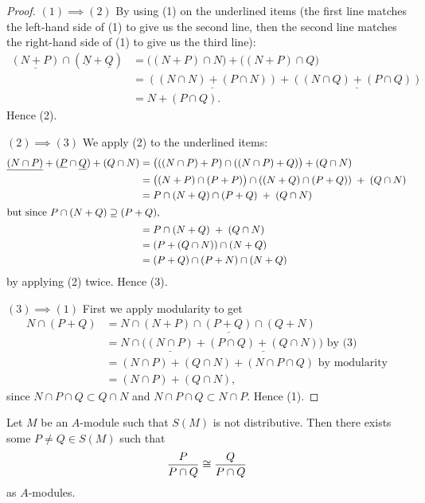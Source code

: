 \begin{proof}
$(1)\implies(2)$ By using (1) on the underlined items (the first line
  matches the left-hand side of (1) to give us the second line, then the second line matches the
  right-hand side of (1) to give us the third line):
\begin{subequations}
  \begin{align}
\underline{(N+P)}\cap(\underline{N}+\underline{Q}) &= \bigl((N+P)\cap N\bigr)+\bigl((N+P)\cap Q\bigr)\\
&=\underline{((N\cap N)+(P\cap N))}+\underline{((N\cap Q)+(P\cap Q))}\\
&=N+(P\cap Q).
  \end{align}
\end{subequations}
Hence (2).

$(2)\implies(3)$ We apply (2) to the underlined items:
\begin{subequations}
  \begin{align}
\underline{(N\cap P)}+(\underline{P}\cap\underline{Q})+(Q\cap N)
&=\bigl(((N\cap P)+P)\cap((N\cap P)+Q)\bigr)+(Q\cap N)\\
&=\bigl((N+P)\cap(P+P)\bigr)\cap((N+Q)\cap(P+Q))\;+\;(Q\cap N)\\
&=P\cap(N+Q)\cap(P+Q)\;+\;(Q\cap N)\\\intertext{but since $P\cap(N+Q)\supset(P+Q)$,}
&=P\cap(N+Q)\;+\;(Q\cap N)\\
&=(P+(Q\cap N))\cap(N+Q)\\
&=(P+Q)\cap(P+N)\cap(N+Q)
  \end{align}
\end{subequations}
by applying (2) twice. Hence (3).

$(3)\implies(1)$
First we apply modularity to get
\begin{subequations}
  \begin{align}
N\cap(P+Q) &=N\cap\underline{(N+P)\cap(P+Q)\cap(Q+N)}\\
&=N\cap\bigl(\underline{(N\cap P)}+\underline{(P\cap Q)+(Q\cap N)}\bigr)\mbox{ by (3)}\\
&=(N\cap P)+(Q\cap N)+(N\cap P\cap Q)\mbox{ by modularity}\\
&=(N\cap P)+(Q\cap N),
  \end{align}
\end{subequations}
since $N\cap P\cap Q\subset Q\cap N$ and $N\cap P\cap Q\subset N\cap P$.
Hence (1).
\end{proof}

\begin{proposition}\label{prop:2.8}
Let $M$ be an $A$-module such that $S(M)$ is not distributive. Then
there exists some $P\neq Q\in S(M)$ such that
\begin{equation}
\frac{P}{P\cap Q}\iso\frac{Q}{P\cap Q}
\end{equation}
as $A$-modules.
\end{proposition}

